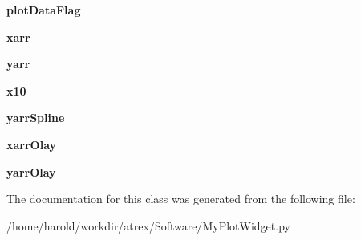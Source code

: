 \begin{DoxyCompactItemize}
\item 
\hypertarget{classMyPlotWidget_1_1MyPlotWidget_a64e693fbacbde23a8c8d08899aa6dcdd}{{\bfseries plot\-Data\-Flag}}\label{classMyPlotWidget_1_1MyPlotWidget_a64e693fbacbde23a8c8d08899aa6dcdd}

\item 
\hypertarget{classMyPlotWidget_1_1MyPlotWidget_af8e35141d9588e42805da0c06bcffd32}{{\bfseries xarr}}\label{classMyPlotWidget_1_1MyPlotWidget_af8e35141d9588e42805da0c06bcffd32}

\item 
\hypertarget{classMyPlotWidget_1_1MyPlotWidget_aa1b1b70359cb0139710db0982040778b}{{\bfseries yarr}}\label{classMyPlotWidget_1_1MyPlotWidget_aa1b1b70359cb0139710db0982040778b}

\item 
\hypertarget{classMyPlotWidget_1_1MyPlotWidget_ada9f240a51b2615a25fef530c4028350}{{\bfseries x10}}\label{classMyPlotWidget_1_1MyPlotWidget_ada9f240a51b2615a25fef530c4028350}

\item 
\hypertarget{classMyPlotWidget_1_1MyPlotWidget_a2bcd4bfd7b9d5c75e58140845b87508d}{{\bfseries yarr\-Spline}}\label{classMyPlotWidget_1_1MyPlotWidget_a2bcd4bfd7b9d5c75e58140845b87508d}

\item 
\hypertarget{classMyPlotWidget_1_1MyPlotWidget_ad4ac85f27d3aded8658bb61a50c3f72e}{{\bfseries xarr\-Olay}}\label{classMyPlotWidget_1_1MyPlotWidget_ad4ac85f27d3aded8658bb61a50c3f72e}

\item 
\hypertarget{classMyPlotWidget_1_1MyPlotWidget_a26308ed5767dd716db3984aa549fddef}{{\bfseries yarr\-Olay}}\label{classMyPlotWidget_1_1MyPlotWidget_a26308ed5767dd716db3984aa549fddef}

\end{DoxyCompactItemize}


The documentation for this class was generated from the following file\-:\begin{DoxyCompactItemize}
\item 
/home/harold/workdir/atrex/\-Software/My\-Plot\-Widget.\-py\end{DoxyCompactItemize}
